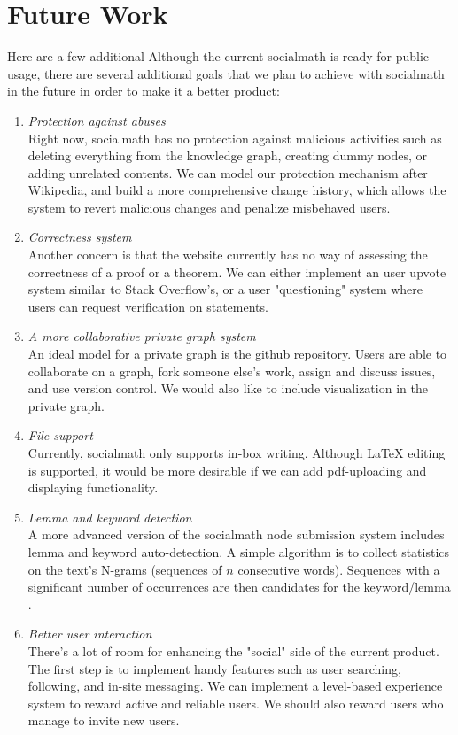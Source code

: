 \documentclass{acm_proc_article-sp}
\begin{document}
\section{Future Work} 
Here are a few additional 
Although the current socialmath is ready for public usage, there are several additional goals that we plan to achieve with socialmath in the future in order to make it a better product:
\begin{enumerate}
\item \emph{Protection against abuses} \\
Right now, socialmath has no protection against malicious activities such as deleting everything from the knowledge graph, creating dummy nodes, or adding unrelated contents. We can model our protection mechanism after Wikipedia, and build a more comprehensive change history, which allows the system to revert malicious changes and penalize misbehaved users. 
\item \emph{Correctness system} \\
Another concern is that the website currently has no way of assessing the correctness of a proof or a theorem. We can either implement an user upvote system similar to Stack Overflow's, or a user "questioning" system where users can request verification on statements. 
\item \emph{A more collaborative private graph system} \\
An ideal model for a private graph is the github repository. Users are able to collaborate on a graph, fork someone else's work, assign and discuss issues, and use version control. We would also like to include visualization in the private graph. 
\item \emph{File support} \\
Currently, socialmath only supports in-box writing. Although LaTeX editing is supported, it would be more desirable if we can add pdf-uploading and displaying functionality. 
\item \emph{Lemma and keyword detection} \\
A more advanced version of the socialmath node submission system includes lemma and keyword auto-detection. A simple algorithm is to collect statistics on the text's N-grams (sequences of $n$ consecutive words).  Sequences with a significant number of occurrences are then candidates for the keyword/lemma \cite{Kumar:2008:AKE:1410140.1410180}.
\item \emph{Better user interaction} \\
There's a lot of room for enhancing the "social" side of the current product. The first step is to implement handy features such as user searching, following, and in-site messaging. We can implement a level-based experience system to reward active and reliable users. We should also reward users who manage to invite new users.
\end{enumerate}
\end{document}
